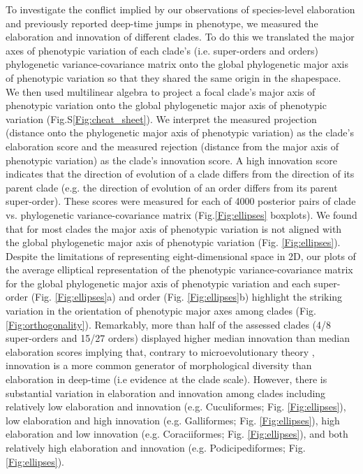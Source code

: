 \documentclass[12pt,letterpaper]{article}
\begin{document}
To investigate the conflict implied by our observations of species-level elaboration and previously reported deep-time jumps in phenotype, we measured the elaboration and innovation of different clades.
To do this we translated the major axes of phenotypic variation of each clade's (i.e. super-orders and orders) phylogenetic variance-covariance matrix onto the global phylogenetic major axis of phenotypic variation so that they shared the same origin in the shapespace.
We then used multilinear algebra to project a focal clade's major axis of phenotypic variation onto the global phylogenetic major axis of phenotypic variation (Fig.S\ref{Fig:cheat_sheet}).
We interpret the measured projection (distance onto the phylogenetic major axis of phenotypic variation) as the clade's elaboration score and the measured rejection (distance from the major axis of phenotypic variation) as the clade's innovation score.
A high innovation score indicates that the direction of evolution of a clade differs from the direction of its parent clade (e.g. the direction of evolution of an order differs from its parent super-order).
These scores were measured for each of 4000 posterior pairs of clade vs. phylogenetic variance-covariance matrix (Fig.\ref{Fig:ellipses} boxplots).
We found that for most clades the major axis of phenotypic variation is not aligned with the global phylogenetic major axis of phenotypic variation (Fig. \ref{Fig:ellipses}). 
Despite the limitations of representing eight-dimensional space in 2D, our plots of the average elliptical representation of the phenotypic variance-covariance matrix for the global phylogenetic major axis of phenotypic variation and each super-order (Fig. \ref{Fig:ellipses}a) and order (Fig. \ref{Fig:ellipses}b) highlight the striking variation in the orientation of phenotypic major axes among clades (Fig. \ref{Fig:orthogonality}).
Remarkably, more than half of the assessed clades (4/8 super-orders and 15/27 orders) displayed higher median innovation than median elaboration scores implying that, contrary to microevolutionary theory \cite{schluter1996adaptive,marroig2005size}, innovation is a more common generator of morphological diversity than elaboration in deep-time (i.e evidence at the clade scale).
However, there is substantial variation in elaboration and innovation among clades including relatively low elaboration and innovation (e.g. Cuculiformes; Fig. \ref{Fig:ellipses}), low elaboration and high innovation (e.g. Galliformes; Fig. \ref{Fig:ellipses}), high elaboration and low innovation (e.g. Coraciiformes; Fig. \ref{Fig:ellipses}), and both relatively high elaboration and innovation (e.g. Podicipediformes; Fig. \ref{Fig:ellipses}).
\end{document}
